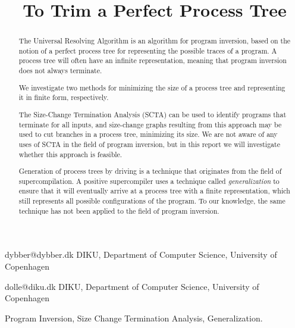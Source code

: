 \documentclass[10pt]{../sigplanconf}
\begin{document}

\title{To Trim a Perfect Process Tree}

           {dybber@dybber.dk}
           {DIKU, Department of Computer Science, University of Copenhagen}

           {dolle@diku.dk}
           {DIKU, Department of Computer Science, University of Copenhagen}

\authorpermission
{}

\maketitle


\begin{abstract}
  The Universal Resolving Algorithm\cite{abramov2000universal} is an
  algorithm for program inversion, based on the notion of a perfect
  process tree for representing the possible traces of a program. A
  process tree will often have an infinite representation, meaning
  that program inversion does not always terminate.

  We investigate two methods for minimizing the size of a process tree
  and representing it in finite form, respectively.

  The Size-Change Termination Analysis (SCTA)\cite{lee2001size} can be
  used to identify programs that terminate for all inputs, and
  size-change graphs resulting from this approach may be used to cut
  branches in a process tree, minimizing its size. We are not aware of
  any uses of SCTA in the field of program inversion, but in this
  report we will investigate whether this approach is feasible.

  Generation of process trees by driving is a technique that
  originates from the field of
  supercompilation\cite{sorensen1998introduction}. A positive
  supercompiler uses a technique called \emph{generalization} to
  ensure that it will eventually arrive at a process tree with a
  finite representation, which still represents all possible
  configurations of the program. To our knowledge, the same technique
  has not been applied to the field of program inversion.
\end{abstract}

\keywords Program Inversion, Size Change Termination Analysis,
Generalization.
\end{document}
